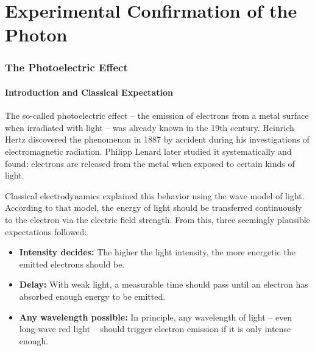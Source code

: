 \chapter{Experimental Confirmation of the Photon}
\setcounter{section}{4}
\setcounter{subsection}{0}
\setcounter{subsubsection}{1}
\setcounter{secnumdepth}{3}
\setlength{\parindent}{0pt}

\subsection{The Photoelectric Effect}

\subsubsection{Introduction and Classical Expectation}

The so-called photoelectric effect – the emission of electrons from a metal surface when irradiated with light – was already known in the 19th century. Heinrich Hertz discovered the phenomenon in 1887 by accident during his investigations of electromagnetic radiation. Philipp Lenard later studied it systematically and found: electrons are released from the metal when exposed to certain kinds of light.

Classical electrodynamics explained this behavior using the wave model of light. According to that model, the energy of light should be transferred continuously to the electron via the electric field strength. From this, three seemingly plausible expectations followed:

\begin{itemize}
	\item \textbf{Intensity decides:} The higher the light intensity, the more energetic the emitted electrons should be.
	\item \textbf{Delay:} With weak light, a measurable time should pass until an electron has absorbed enough energy to be emitted.
	\item \textbf{Any wavelength possible:} In principle, any wavelength of light – even long-wave red light – should trigger electron emission if it is only intense enough.
\end{itemize}

